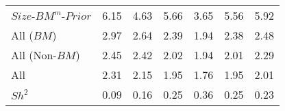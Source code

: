 \begin{table}[!ht]
\begin{tabular}{lrrrrrr}
    $Size$-$BM^m$-$Prior$  & 6.15  & 4.63  & 5.66  & 3.65  & 5.56  & 5.92  \\
  
    All ($BM$)  & 2.97  & 2.64  & 2.39  & 1.94  & 2.38  & 2.48  \\
  
    All (Non-$BM$)  & 2.45  & 2.42  & 2.02  & 1.94  & 2.01  & 2.29  \\
  
    All  & 2.31  & 2.15  & 1.95  & 1.76  & 1.95  & 2.01  \\
  
    $Sh^2$  & 0.09  & 0.16  & 0.25  & 0.36  & 0.25  & 0.23  \\
  
  \bottomrule
\end{tabular}
\label{tbl:GRS}
\end{table}